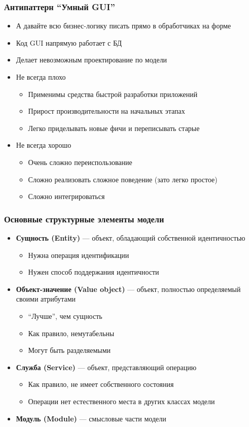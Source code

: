 \documentclass{../../slides-style}
\begin{document}
	\begin{frame}
		\frametitle{Антипаттерн ``Умный GUI''}
		\begin{itemize}
			\item А давайте всю бизнес-логику писать прямо в обработчиках на форме
			\item Код GUI напрямую работает с БД
			\item Делает невозможным проектирование по модели
			\item Не всегда плохо
			\begin{itemize}
				\item Применимы средства быстрой разработки приложений
				\item Прирост производительности на начальных этапах
				\item Легко приделывать новые фичи и переписывать старые
			\end{itemize}
			\item Не всегда хорошо
			\begin{itemize}
				\item Очень сложно переиспользование
				\item Сложно реализовать сложное поведение (зато легко простое)
				\item Сложно интегрироваться
			\end{itemize}
		\end{itemize}
	\end{frame}

	\begin{frame}
		\frametitle{Основные структурные элементы модели}
		\begin{itemize}
			\item \textbf{Сущность (Entity)} --- объект, обладающий собственной идентичностью
			\begin{itemize}
				\item Нужна операция идентификации
				\item Нужен способ поддержания идентичности
			\end{itemize}
			\item \textbf{Объект-значение (Value object)} --- объект, полностью определяемый своими атрибутами
			\begin{itemize}
				\item ``Лучше'', чем сущность
				\item Как правило, немутабельны
				\item Могут быть разделяемыми
			\end{itemize}
			\item \textbf{Служба (Service)} --- объект, представляющий операцию
			\begin{itemize}
				\item Как правило, не имеет собственного состояния
				\item Операции нет естественного места в других классах модели
			\end{itemize}
			\item \textbf{Модуль (Module)} --- смысловые части модели
		\end{itemize}
	\end{frame}
\end{document}
